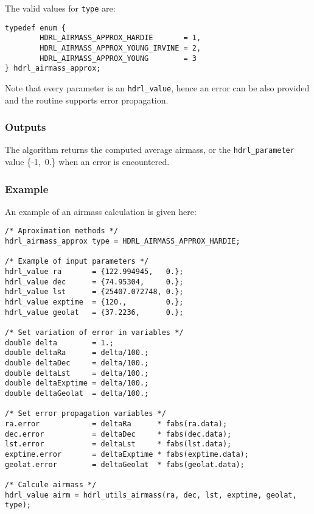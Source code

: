 The valid values for \verb+type+ are:
\begin{lstlisting}
typedef enum {
        HDRL_AIRMASS_APPROX_HARDIE       = 1,	
        HDRL_AIRMASS_APPROX_YOUNG_IRVINE = 2,
        HDRL_AIRMASS_APPROX_YOUNG        = 3
} hdrl_airmass_approx;
\end{lstlisting}

Note that every parameter is an \verb+hdrl_value+, hence an error can be also provided and the routine supports error propagation.


\subsubsection{Outputs}
\label{sec:algorithms:airmass:outputs}
The algorithm returns the computed average airmass, or the \verb+hdrl_parameter+ value \{-1,\ 0.\} when an error is encountered.


\subsubsection{Example}
\label{sec:algorithms:airmass:example}

An example of an airmass calculation is given here:

\begin{lstlisting}
/* Aproximation methods */
hdrl_airmass_approx type = HDRL_AIRMASS_APPROX_HARDIE;

/* Example of input parameters */
hdrl_value ra       = {122.994945,   0.};
hdrl_value dec      = {74.95304,     0.};
hdrl_value lst      = {25407.072748, 0.};
hdrl_value exptime  = {120.,         0.};
hdrl_value geolat   = {37.2236,      0.};

/* Set variation of error in variables */
double delta        = 1.;
double deltaRa      = delta/100.;
double deltaDec     = delta/100.;
double deltaLst     = delta/100.;
double deltaExptime = delta/100.;
double deltaGeolat  = delta/100.;

/* Set error propagation variables */
ra.error            = deltaRa      * fabs(ra.data);
dec.error           = deltaDec     * fabs(dec.data);
lst.error           = deltaLst     * fabs(lst.data);
exptime.error       = deltaExptime * fabs(exptime.data);
geolat.error        = deltaGeolat  * fabs(geolat.data);

/* Calcule airmass */
hdrl_value airm = hdrl_utils_airmass(ra, dec, lst, exptime, geolat, type);
\end{lstlisting}

